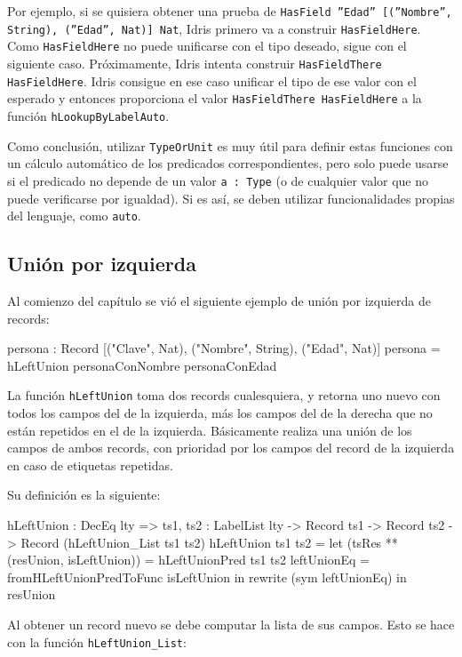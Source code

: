 Por ejemplo, si se quisiera obtener una prueba de \texttt{HasField ''Edad'' [(''Nombre'', String), (''Edad'', Nat)] Nat}, Idris primero va a construir \texttt{HasFieldHere}. Como \texttt{HasFieldHere} no puede unificarse con el tipo deseado, sigue con el siguiente caso. Próximamente, Idris intenta construir \texttt{HasFieldThere HasFieldHere}. Idris consigue en ese caso unificar el tipo de ese valor con el esperado y entonces proporciona el valor \texttt{HasFieldThere HasFieldHere} a la función \texttt{hLookupByLabelAuto}.

Como conclusión, utilizar \texttt{TypeOrUnit} es muy útil para definir estas funciones con un cálculo automático de los predicados correspondientes, pero solo puede usarse si el predicado no depende de un valor \texttt{a : Type} (o de cualquier valor que no puede verificarse por igualdad). Si es así, se deben utilizar funcionalidades propias del lenguaje, como \texttt{auto}.

\subsection{Unión por izquierda}

Al comienzo del capítulo se vió el siguiente ejemplo de unión por izquierda de records:

\begin{code}
persona : Record [("Clave", Nat), ("Nombre", String),
  ("Edad", Nat)]
persona = hLeftUnion personaConNombre personaConEdad
\end{code}

La función \texttt{hLeftUnion} toma dos records cualesquiera, y retorna uno nuevo con todos los campos del de la izquierda, más los campos del de la derecha que no están repetidos en el de la izquierda. Básicamente realiza una unión de los campos de ambos records, con prioridad por los campos del record de la izquierda en caso de etiquetas repetidas.

Su definición es la siguiente:

\begin{code}
hLeftUnion : DecEq lty => {ts1, ts2 : LabelList lty} ->
  Record ts1 -> Record ts2 -> Record (hLeftUnion_List ts1 ts2)
hLeftUnion ts1 ts2 =
  let (tsRes ** (resUnion, isLeftUnion)) =
      hLeftUnionPred ts1 ts2
    leftUnionEq = fromHLeftUnionPredToFunc isLeftUnion
  in rewrite (sym leftUnionEq) in resUnion
\end{code}

Al obtener un record nuevo se debe computar la lista de sus campos. Esto se hace con la función \texttt{hLeftUnion\_List}:

